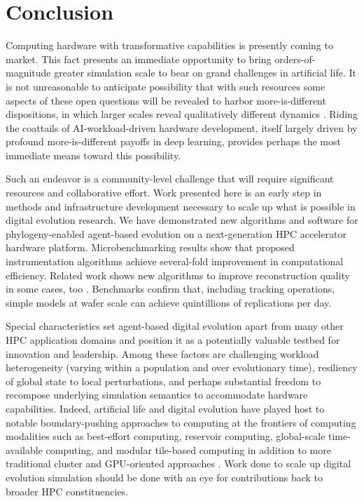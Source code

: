 \section{Conclusion} \label{sec:conclusion}

Computing hardware with transformative capabilities is presently coming to market.
This fact presents an immediate opportunity to bring orders-of-magnitude greater simulation scale to bear on grand challenges in artificial life.
It is not unreasonable to anticipate possibility that with such resources some aspects of these open questions will be revealed to harbor more-is-different dispositions, in which larger scales reveal qualitatively different dynamics \citep{anderson1972more}.
Riding the coattails of AI-workload-driven hardware development, itself largely driven by profound more-is-different payoffs in deep learning, provides perhaps the most immediate means toward this possibility.

Such an endeavor is a community-level challenge that will require significant resources and collaborative effort.
Work presented here is an early step in methods and infrastructure development necessary to scale up what is possible in digital evolution research.
We have demonstrated new algorithms and software for phylogeny-enabled agent-based evolution on a next-generation HPC accelerator hardware platform.
Microbenchmarking results show that proposed instrumentation algorithms achieve several-fold improvement in computational efficiency.
Related work shows new algorithms to improve reconstruction quality in some cases, too \citep{moreno2024guide}.
Benchmarks confirm that, including tracking operations, simple models at wafer scale can achieve quintillions of replications per day.

Special characteristics set agent-based digital evolution apart from many other HPC application domains and position it as a potentially valuable testbed for innovation and leadership.
Among these factors are challenging workload heterogeneity (varying within a population and over evolutionary time), resiliency of global state to local perturbations, and perhaps substantial freedom to recompose underlying simulation semantics to accommodate hardware capabilities.
Indeed, artificial life and digital evolution have played host to notable boundary-pushing approaches to computing at the frontiers of computing modalities such as best-effort computing, reservoir computing, global-scale time-available computing, and modular tile-based computing in addition to more traditional cluster and GPU-oriented approaches \citep{moreno2021conduit,ackley2020best,ackley2023robust,heinemann2008artificial,miikkulainen2024evolving,ray1995proposal}.
Work done to scale up digital evolution simulation should be done with an eye for contributions back to broader HPC constituencies.

